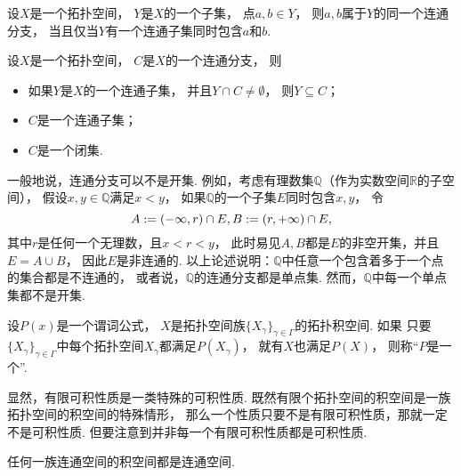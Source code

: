 \begin{proposition}
设\(X\)是一个拓扑空间，
\(Y\)是\(X\)的一个子集，
点\(a,b \in Y\)，
则\(a,b\)属于\(Y\)的同一个连通分支，
当且仅当\(Y\)有一个连通子集同时包含\(a\)和\(b\).
\end{proposition}

\begin{theorem}\label{theorem:连通分支.连通分支的性质1}
设\(X\)是一个拓扑空间，
\(C\)是\(X\)的一个连通分支，
则\begin{itemize}
	\item 如果\(Y\)是\(X\)的一个连通子集，
	并且\(Y \cap C \neq \emptyset\)，
	则\(Y \subseteq C\)；

	\item \(C\)是一个连通子集；

	\item \(C\)是一个闭集.
\end{itemize}
\end{theorem}

一般地说，连通分支可以不是开集.
例如，考虑有理数集\(\mathbb{Q}\)（作为实数空间\(\mathbb{R}\)的子空间），
假设\(x,y\in\mathbb{Q}\)满足\(x<y\)，
如果\(\mathbb{Q}\)的一个子集\(E\)同时包含\(x,y\)，
令\begin{equation*}
	A := (-\infty,r) \cap E,
	B := (r,+\infty) \cap E,
\end{equation*}
其中\(r\)是任何一个无理数，且\(x<r<y\)，
此时易见\(A,B\)都是\(E\)的非空开集，并且\(E = A \cup B\)，
因此\(E\)是非连通的.
以上论述说明：\(\mathbb{Q}\)中任意一个包含着多于一个点的集合都是不连通的，
或者说，\(\mathbb{Q}\)的连通分支都是单点集.
然而，\(\mathbb{Q}\)中每一个单点集都不是开集.

\begin{definition}
设\(P(x)\)是一个谓词公式，
\(X\)是拓扑空间族\(\{X_\gamma\}_{\gamma \in \Gamma}\)的拓扑积空间.
如果
	只要\(\{X_\gamma\}_{\gamma \in \Gamma}\)中每个拓扑空间\(X_\gamma\)都满足\(P(X_\gamma)\)，
	就有\(X\)也满足\(P(X)\)，
则称“\(P\)是一个”.
\end{definition}
显然，有限可积性质是一类特殊的可积性质.
既然有限个拓扑空间的积空间是一族拓扑空间的积空间的特殊情形，
那么一个性质只要不是有限可积性质，那就一定不是可积性质.
但要注意到并非每一个有限可积性质都是可积性质.

\begin{theorem}
任何一族连通空间的积空间都是连通空间.
\end{theorem}
